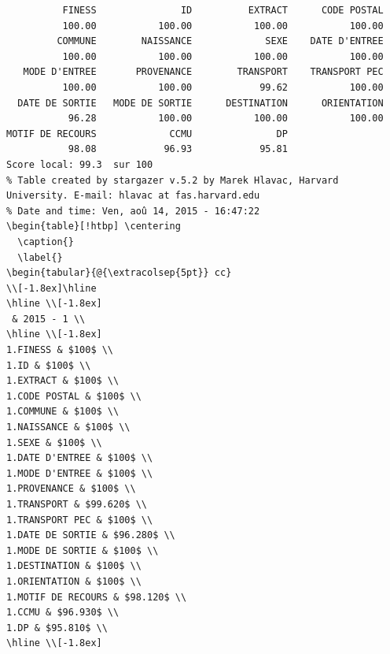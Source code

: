 \documentclass[]{article}
\begin{document}
\begin{verbatim}
          FINESS               ID          EXTRACT      CODE POSTAL 
          100.00           100.00           100.00           100.00 
         COMMUNE        NAISSANCE             SEXE    DATE D'ENTREE 
          100.00           100.00           100.00           100.00 
   MODE D'ENTREE       PROVENANCE        TRANSPORT    TRANSPORT PEC 
          100.00           100.00            99.62           100.00 
  DATE DE SORTIE   MODE DE SORTIE      DESTINATION      ORIENTATION 
           96.28           100.00           100.00           100.00 
MOTIF DE RECOURS             CCMU               DP 
           98.08            96.93            95.81 
Score local: 99.3  sur 100
% Table created by stargazer v.5.2 by Marek Hlavac, Harvard University. E-mail: hlavac at fas.harvard.edu
% Date and time: Ven, aoû 14, 2015 - 16:47:22
\begin{table}[!htbp] \centering 
  \caption{} 
  \label{} 
\begin{tabular}{@{\extracolsep{5pt}} cc} 
\\[-1.8ex]\hline 
\hline \\[-1.8ex] 
 & 2015 - 1 \\ 
\hline \\[-1.8ex] 
1.FINESS & $100$ \\ 
1.ID & $100$ \\ 
1.EXTRACT & $100$ \\ 
1.CODE POSTAL & $100$ \\ 
1.COMMUNE & $100$ \\ 
1.NAISSANCE & $100$ \\ 
1.SEXE & $100$ \\ 
1.DATE D'ENTREE & $100$ \\ 
1.MODE D'ENTREE & $100$ \\ 
1.PROVENANCE & $100$ \\ 
1.TRANSPORT & $99.620$ \\ 
1.TRANSPORT PEC & $100$ \\ 
1.DATE DE SORTIE & $96.280$ \\ 
1.MODE DE SORTIE & $100$ \\ 
1.DESTINATION & $100$ \\ 
1.ORIENTATION & $100$ \\ 
1.MOTIF DE RECOURS & $98.120$ \\ 
1.CCMU & $96.930$ \\ 
1.DP & $95.810$ \\ 
\hline \\[-1.8ex] 

\end{verbatim}
\end{document}
